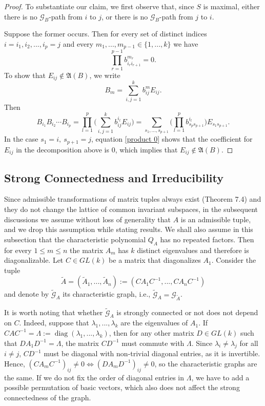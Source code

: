 \documentclass[draft, 12pt, reqno]{amsart}
\numberwithin{equation}{section}
\DeclareMathOperator{\diag}{diag}
\theoremstyle{plain}
\begin{document}
\begin{proof}
To substantiate our claim, we first observe that, since $S$ is maximal, either there is no $\mathcal{G}_B$-path from $i$ to $j$, or there is no $\mathcal{G}_B$-path from $j$ to $i$. 

Suppose the former occurs. Then for every set of distinct indices $i=i_1, i_2,...,i_p=j$ and every $m_1,...,m_{p-1}\in \{1,...,k\}$ we have
\begin{equation}\label{product 0}
\displaystyle \prod_{r=1}^{p-1} b_{i_r i_{r+1}}^{m_r}=0.	
\end{equation}
To show that $E_{ij}\notin \mathfrak{A}(B)$, we write
$$ B_m=\displaystyle \sum_{i,j=1}^k b_{ij}^m E_{ij}.$$
Then
$$B_{i_1}B_{i_2}\cdots B_{i_p}=\displaystyle \prod_{l=1}^p \Big(\sum_{i,j=1}^k b_{ij}^{i_l} E_{ij}\Big)=\sum_{s_1,...,s_{p+1}}\Big(\prod_{l=1}^p b^{i_l}_{s_p s_{p+1}}\Big)E_{s_1 s_{p+1}}.$$
In the case $s_1=i, \ s_{p+1}=j$, equation \eqref{product 0} shows that the coefficient for $E_{ij}$ in the decomposition above is 0, which implies that $E_{ij}\notin \mathfrak{A}(B)$.
\end{proof}

\subsection{Strong Connectedness and Irreducibility}
Since admissible transformations of matrix tuples always exist (Theorem 7.4) and they do not change the lattice of common invariant subspaces, in the subsequent discussions we assume without loss of generality that $A$ is an admissible tuple, and we drop this assumption while stating results.  We shall also assume in this subsection that the characteristic polynomial $Q_A$ has no repeated factors. Then for every $1\leq m\leq n$ the matrix $A_m$ has $k$ distinct eigenvalues and therefore is diagonalizable. Let $C\in GL(k)$ be a matrix that diagonalizes $A_1$. Consider the tuple 
\[\widetilde{A}=(\widetilde{A}_1, ..., \widetilde{A}_n):=(CA_1C^{-1}, ..., CA_nC^{-1})\] and denote by $\widetilde{\mathcal{G}}_A$ its characteristic graph, i.e., $\widetilde{\mathcal{G}}_A=\mathcal{G}_{\widetilde{A}}$. 

It is worth noting that whether $\widetilde{\mathcal{G}}_A$ is strongly connected or not does not depend on $C$. Indeed, suppose that $\lambda_1,...,\lambda_k$ are the eigenvalues of $A_1$. If $CAC^{-1}=\Lambda:=\diag(\lambda_1,...,\lambda_k)$, then for any other matrix $D\in GL(k)$
such that $DA_1D^{-1}=\Lambda$, the matrix $CD^{-1}$ must commute with $\Lambda$. Since $\lambda_i\neq \lambda_j$ for all $i\neq j$, $CD^{-1}$ must be diagonal with non-trivial diagonal entries, as it is invertible. Hence, $(CA_mC^{-1})_{ij}\neq 0 \iff (DA_mD^{-1})_{ij} \neq 0$, so the characteristic graphs are the same. If we do not fix the order of diagonal entries in $\Lambda$, we have to add a possible permutation of basic vectors, which also does not affect the strong connectedness of the graph. 
\end{document}

